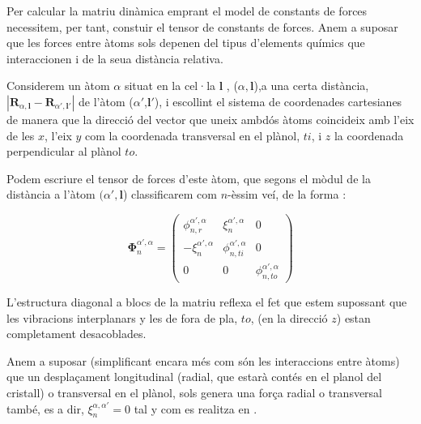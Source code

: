 \documentclass[12pt]{article} %
\let\vec\mathbf %
\begin{document}
Per calcular la matriu dinàmica emprant el model de constants de forces necessitem, per tant, constuir el tensor de constants de forces. Anem a suposar que les forces entre àtoms sols depenen del tipus d'elements químics que interaccionen i de la seua distància relativa.

Considerem un àtom $\alpha$ situat en la cel·la $\vec l$ , ($\alpha, \vec l$),a una certa distància, $|\vec R_{\alpha,\vec l}-\vec R_{\alpha',\vec{l'}}|$ de l'àtom  ($\alpha'$,$\vec l'$), i escollint el sistema de coordenades cartesianes de manera que la direcció del vector que uneix ambdós àtoms coincideix amb l'eix de les $x$, l'eix $y$ com la coordenada transversal en el plànol, $ti$, i $z$ la coordenada perpendicular al plànol $to$.

Podem escriure el tensor de forces d'este àtom, que segons el mòdul de la distància a l'àtom $(\alpha',\vec l$) classificarem com $n$-èssim veí, de la forma \cite{wirtz04_phonon_disper_graph_revis}:


\begin{equation}
\vec\Phi_n^{\alpha',\alpha}=\begin{pmatrix}
\phi_{n,r}^{\alpha',\alpha}&\xi_n^{\alpha',\alpha} &0\\
-\xi_n^{\alpha',\alpha} & \phi_{n,ti}^{\alpha',\alpha} & 0 \\
0 & 0 & \phi_{n,to}^{\alpha',\alpha}
\end{pmatrix}
\label{eq:tensordeforces}
\end{equation}

L'estructura diagonal a blocs de la matriu reflexa el fet que estem supossant que  les vibracions interplanars y les de fora de pla, $to$, (en la direcció $z$) estan completament desacoblades.

Anem a suposar (simplificant encara més com són les interaccions entre àtoms) que un despla\c{c}ament longitudinal (radial, que estarà contés en el planol del cristall) o transversal en el plànol, sols genera una força radial o transversal també, es a dir, $\xi_n^{\alpha,\alpha'}=0$ tal y com es realitza en \cite{Balkanski_2000}. %



\end{document}
